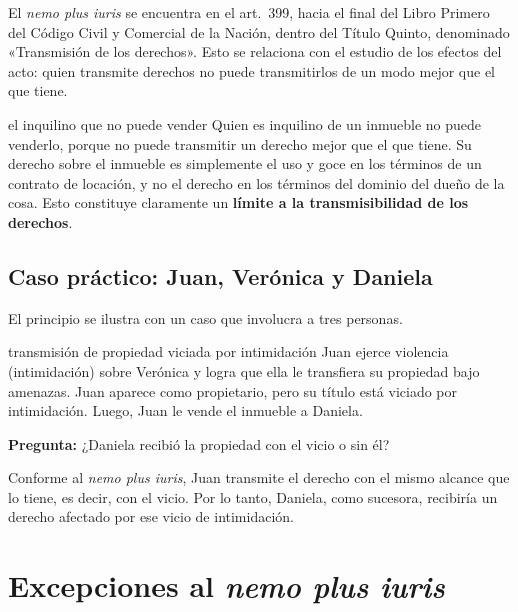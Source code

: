 \documentclass[12pt,oneside]{book}
\begin{document}
\begin{note}
El \textit{nemo plus iuris} se encuentra en el art.~399, hacia el final del Libro Primero del Código Civil y Comercial de la Nación, dentro del Título Quinto, denominado «Transmisión de los derechos». Esto se relaciona con el estudio de los efectos del acto: quien transmite derechos no puede transmitirlos de un modo mejor que el que tiene.
\end{note}

\begin{example}{el inquilino que no puede vender}
Quien es inquilino de un inmueble no puede venderlo, porque no puede transmitir un derecho mejor que el que tiene. Su derecho sobre el inmueble es simplemente el uso y goce en los términos de un contrato de locación, y no el derecho en los términos del dominio del dueño de la cosa. Esto constituye claramente un \textbf{límite a la transmisibilidad de los derechos}.
\end{example}

\subsection{Caso práctico: Juan, Verónica y Daniela}

El principio se ilustra con un caso que involucra a tres personas.

\begin{example}{transmisión de propiedad viciada por intimidación}
Juan ejerce violencia (intimidación) sobre Verónica y logra que ella le transfiera su propiedad bajo amenazas. Juan aparece como propietario, pero su título está viciado por intimidación. Luego, Juan le vende el inmueble a Daniela.

\smallskip
\textbf{Pregunta:} ¿Daniela recibió la propiedad con el vicio o sin él?

\smallskip
Conforme al \textit{nemo plus iuris}, Juan transmite el derecho con el mismo alcance que lo tiene, es decir, con el vicio. Por lo tanto, Daniela, como sucesora, recibiría un derecho afectado por ese vicio de intimidación.
\end{example}

\section[Excepciones al nemo plus iuris]{Excepciones al \textit{nemo plus iuris}}
\end{document}
